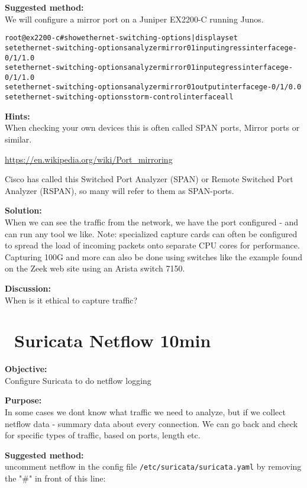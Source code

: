\documentclass[a4paper,11pt,notitlepage]{report}
\begin{document}
{\bf Suggested method:}\\
We will configure a mirror port on a Juniper EX2200-C running Junos.

\begin{alltt}
root@ex2200-c# show ethernet-switching-options | display set
set ethernet-switching-options analyzer mirror01 input ingress interface ge-0/1/1.0
set ethernet-switching-options analyzer mirror01 input egress interface ge-0/1/1.0
set ethernet-switching-options analyzer mirror01 output interface ge-0/1/0.0
set ethernet-switching-options storm-control interface all
\end{alltt}


{\bf Hints:}\\
When checking your own devices this is often called SPAN ports, Mirror ports or similar.

\url{https://en.wikipedia.org/wiki/Port_mirroring}

Cisco has called this Switched Port Analyzer (SPAN) or Remote Switched Port Analyzer (RSPAN), so many will refer to them as SPAN-ports.

{\bf Solution:}\\
When we can see the traffic from the network, we have the port configured - and can run any tool we like. Note: specialized capture cards can often be configured to spread the load of incoming packets onto separate CPU cores for performance. Capturing 100G and more can also be done using switches like the example found on the Zeek web site using an Arista switch 7150.


{\bf Discussion:}\\
When is it ethical to capture traffic?


\chapter{\faInfoCircle\ Suricata Netflow 10min}
\label{ex:suricatanetflow}


{\bf Objective:} \\
Configure Suricata to do netflow logging


{\bf Purpose:}\\
In some cases we dont know what traffic we need to analyze, but if we collect netflow data - summary data about every connection. We can go back and check for specific types of traffic, based on ports, length etc.


{\bf Suggested method:}\\

uncomment netflow in the config file \verb+/etc/suricata/suricata.yaml+
by removing the "\#" in front of this line:
\end{document}
